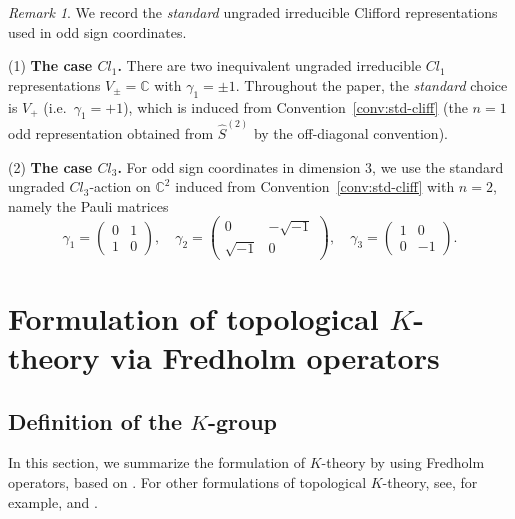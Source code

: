 \documentclass{amsart}
\theoremstyle{definition}
\theoremstyle{remark}
\newtheorem{rem}[thm]{Remark}
\newcommand{\C}{\mathbb{C}}
\begin{document}
\begin{rem}\label{rem:std-ungraded-Cl1-Cl3}
We record the \emph{standard} ungraded irreducible Clifford representations used in odd sign coordinates.

\smallskip
\noindent
(1) \textbf{The case $Cl_{1}$.}
There are two inequivalent ungraded irreducible $Cl_{1}$ representations $V_{\pm}=\C$ with $\gamma_{1}=\pm 1$.
Throughout the paper, the \emph{standard} choice is $V_{+}$ (i.e.\ $\gamma_{1}=+1$), which is induced from
Convention~\ref{conv:std-cliff} (the $n=1$ odd representation obtained from $\hat S^{(2)}$ by the off-diagonal convention).

\smallskip
\noindent
(2) \textbf{The case $Cl_{3}$.}
For odd sign coordinates in dimension $3$, we use the standard ungraded $Cl_{3}$-action on $\C^{2}$
induced from Convention~\ref{conv:std-cliff} with $n=2$, namely the Pauli matrices
\[
\gamma_{1}=
\begin{pmatrix}
0 & 1\\
1 & 0
\end{pmatrix},\quad
\gamma_{2}=
\begin{pmatrix}
0 & -\sqrt{-1}\\
\sqrt{-1} & 0
\end{pmatrix},\quad
\gamma_{3}=
\begin{pmatrix}
1 & 0\\
0 & -1
\end{pmatrix}.
\]
\end{rem}


\section{Formulation of topological $K$-theory via Fredholm operators}
\label{sec:$K$-theory}


\subsection{Definition of the $K$-group}
\label{subsec:Definition of $K$-theory}


In this section, we summarize the formulation of $K$-theory by using Fredholm operators, based on \cite{A-Si}. For other formulations of topological $K$-theory, see, for example, \cite{A1} and \cite{Karoubi}.
\end{document}
